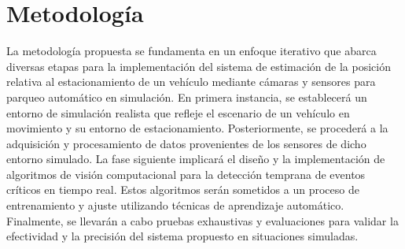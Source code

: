 \documentclass[12pt,letterpaper,final]{article}
\begin{document}
    \section*{Metodología}
    \justify
    La metodología propuesta se fundamenta en un enfoque iterativo que abarca diversas etapas para la implementación del sistema
    de estimación de la posición relativa al estacionamiento de un vehículo mediante cámaras y sensores para parqueo automático en simulación.
    En primera instancia, se establecerá un entorno de simulación realista que refleje el escenario de un vehículo en movimiento y su entorno de estacionamiento.
    Posteriormente, se procederá a la adquisición y procesamiento de datos provenientes de los sensores de dicho entorno simulado.
    La fase siguiente implicará el diseño y la implementación de algoritmos de visión computacional para la detección temprana de eventos críticos en tiempo real.
    Estos algoritmos serán sometidos a un proceso de entrenamiento y ajuste utilizando técnicas de aprendizaje automático.
    Finalmente, se llevarán a cabo pruebas exhaustivas y evaluaciones para validar la efectividad y la precisión del sistema propuesto en situaciones simuladas.
\end{document}
